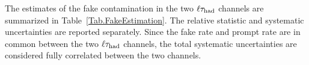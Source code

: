 The estimates of the fake \Tau contamination in the two $\ell\tau_{\rm had}$ 
channels are summarized in Table~\ref{Tab.FakeEstimation}. 
The relative statistic and systematic uncertainties are reported separately. 
Since the fake rate and prompt rate are in common between the two 
$\ell\tau_{\rm had}$ channels, the total systematic uncertainties are considered 
fully correlated between the two channels.
